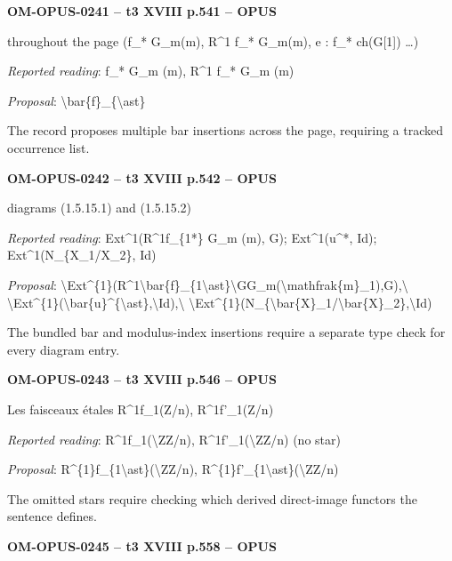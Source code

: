 \par\noindent\textbf{OM-OPUS-0241 -- t3 XVIII p.541 -- OPUS}\par
throughout the page (f\_* G\_m(m), R\textasciicircum{}1 f\_* G\_m(m), e : f\_* ch(G[1]) …)\par
\emph{Reported reading}: f\_* G\_m (m), R\textasciicircum{}1 f\_* G\_m (m)\par
\emph{Proposal}: \textbackslash{}bar\{f\}\_\{\textbackslash{}ast\}\par
The record proposes multiple bar insertions across the page, requiring a tracked occurrence list.\par
\par\noindent\textbf{OM-OPUS-0242 -- t3 XVIII p.542 -- OPUS}\par
diagrams (1.5.15.1) and (1.5.15.2)\par
\emph{Reported reading}: Ext\textasciicircum{}1(R\textasciicircum{}1f\_\{1*\} G\_m (m), G); Ext\textasciicircum{}1(u\textasciicircum{}*, Id); Ext\textasciicircum{}1(N\_\{X\_1/X\_2\}, Id)\par
\emph{Proposal}: \textbackslash{}Ext\textasciicircum{}\{1\}(R\textasciicircum{}1\textbackslash{}bar\{f\}\_\{1\textbackslash{}ast\}\textbackslash{}GG\_m(\textbackslash{}mathfrak\{m\}\_1),G),\textbackslash{} \textbackslash{}Ext\textasciicircum{}\{1\}(\textbackslash{}bar\{u\}\textasciicircum{}\{\textbackslash{}ast\},\textbackslash{}Id),\textbackslash{} \textbackslash{}Ext\textasciicircum{}\{1\}(N\_\{\textbackslash{}bar\{X\}\_1/\textbackslash{}bar\{X\}\_2\},\textbackslash{}Id)\par
The bundled bar and modulus-index insertions require a separate type check for every diagram entry.\par
\par\noindent\textbf{OM-OPUS-0243 -- t3 XVIII p.546 -- OPUS}\par
Les faisceaux étales R\textasciicircum{}1f\_1(Z/n), R\textasciicircum{}1f'\_1(Z/n)\par
\emph{Reported reading}: R\textasciicircum{}1f\_1(\textbackslash{}ZZ/n), R\textasciicircum{}1f'\_1(\textbackslash{}ZZ/n) (no star)\par
\emph{Proposal}: R\textasciicircum{}\{1\}f\_\{1\textbackslash{}ast\}(\textbackslash{}ZZ/n), R\textasciicircum{}\{1\}f'\_\{1\textbackslash{}ast\}(\textbackslash{}ZZ/n)\par
The omitted stars require checking which derived direct-image functors the sentence defines.\par
\par\noindent\textbf{OM-OPUS-0245 -- t3 XVIII p.558 -- OPUS}\par
